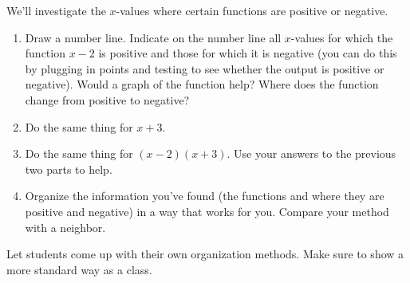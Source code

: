 \documentclass[noauthor,noinstructornotes]{ximera}
\begin{document}
\begin{problem}
We'll investigate the \(x\)-values where certain functions are positive or negative.

\begin{enumerate}
    \item Draw a number line. Indicate on the number line all \(x\)-values
    for which the function \(x - 2\) is positive and those for which
    it is negative (you can do this by plugging in points and testing
    to see whether the output is positive or negative). Would a graph 
    of the function help? 
    Where does the function change from positive to negative?
    \item Do the same thing for \(x + 3\).
    \item Do the same thing for \((x - 2)(x + 3)\). Use your answers to
    the previous two parts to help.
    \item Organize the information you've found (the functions and where they
    are positive and negative) in a way that works for
    you. Compare your method with a neighbor.
\end{enumerate}

\begin{instructorNotes}
Let students come up with their own organization methods. Make sure to show
a more standard way as a class.
\end{instructorNotes}
\end{problem}
\end{document}
